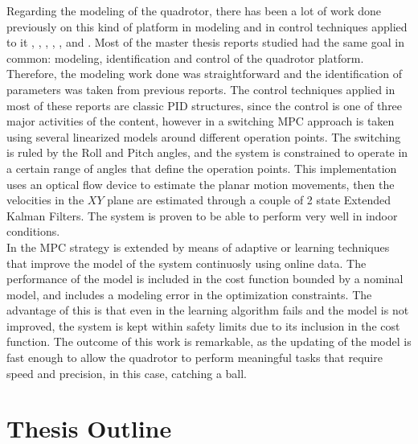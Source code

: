Regarding the modeling of the quadrotor, there has been a lot of work done previously on this kind of platform in modeling and in control techniques applied to it \cite{ref:Bouabdallah2004},  \cite{ref:Bresciani2008}, \cite{ref:Lellis2011}, \cite{ref:Raffo2011}, \cite{ref:Salih2010}, \cite{ref:YueSun2012} and \cite{ref:MahoneyKumar2012}. Most of the master thesis reports studied had the same goal in common: modeling, identification and control of the quadrotor platform. Therefore, the modeling work done was straightforward and the identification of parameters was taken from previous reports. The control techniques applied in most of these reports are classic PID structures, since the control is one of three major activities of the content, however in \cite{ref:KostasetAl} a switching MPC approach is taken using several linearized models around different operation points. The switching is ruled by the Roll and Pitch angles, and the system is constrained to operate in a certain range of angles that define the operation points. This implementation uses an optical flow device to estimate the planar motion movements, then the velocities in the $XY$ plane are estimated through a couple of 2 state Extended Kalman Filters. The system is proven to be able to perform very well in indoor conditions.\\

In \cite{ref:Bouffard2011} the MPC strategy is extended by means of adaptive or learning techniques that improve the model of the system continuosly using online data. The performance of the model is included in the cost function bounded by a nominal model, and includes a modeling error in the optimization constraints. The advantage of this is that even in the learning algorithm fails and the model is not improved, the system is kept within safety limits due to its inclusion in the cost function. The outcome of this work is remarkable, as the updating of the model is fast enough to allow the quadrotor to perform meaningful tasks that require speed and precision, in this case, catching a ball.

\section{Thesis Outline}

